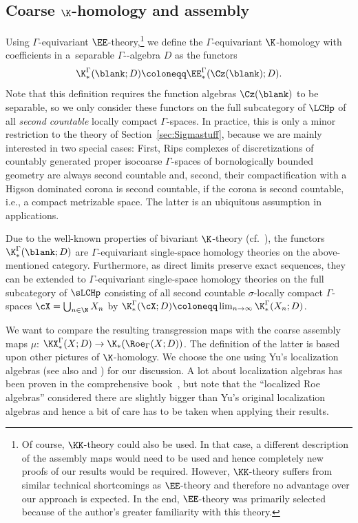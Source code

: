 \subsection[Coarse K-homology and assembly]{Coarse $\boldsymbol{\K}$-homology and assembly}\label{sec:Assembly}

Using $\Gamma$-equivariant $\EE$-theory,\footnote{Of course, $\KK$-theory could also be used. In that case, a different description of the assembly maps would need to be used and hence completely new proofs of our results would be required. However, $\KK$-theory suffers from similar technical shortcomings as $\EE$-theory and therefore no advantage over our approach is expected. In the end, $\EE$-theory was primarily selected because of the author's greater familiarity with this theory.} we define the $\Gamma$-equivariant $\K$-homology with coefficients in a~separable $\Gamma$-\textCstar-algebra $D$ as the functors
\[
\K^\Gamma_*(\blank;D)\coloneqq \EE^\Gamma_*(\Cz(\blank);D).
\]
Note that this definition requires the function algebras $\Cz(\blank)$ to be separable, so we only consider these functors on the full subcategory of $\LCHp$ of all \emph{second countable} locally compact $\Gamma$-spaces.
In practice, this is only a minor restriction to the theory of Section~\ref{sec:Sigmastuff}, because we are mainly interested in two special cases: First, Rips complexes of discretizations of countably generated proper isocoarse $\Gamma$-spaces of bornologically bounded geometry are always second countable and, second, their compactification with a Higson dominated corona is second countable, if the corona is second countable, i.e., a compact metrizable space. The latter is an ubiquitous assumption in applications.


Due to the well-known properties of bivariant $\K$-theory (cf.\ \cite[Chapter~6]{GueHigTro}), the functors $\K^\Gamma_*(\blank;D)$ are $\Gamma$-equivariant single-space homology theories on the above-mentioned category. Furthermore, as direct limits preserve exact sequences, they can be extended to $\Gamma$-equivariant single-space homology theories on the full subcategory of $\sLCHp$ consisting of all second countable $\sigma$-locally compact $\Gamma$-spaces $\cX=\bigcup_{n\in\N}X_n$ by
\(\K^\Gamma_*(\cX;D)\coloneqq\lim_{n\to\infty}\K^\Gamma_*(X_n;D)\).


We want to compare the resulting transgression maps with the coarse assembly maps $\mu$: $\KX^\Gamma_*(X;D)\to\K_*(\Roe_\Gamma(X;D))$. The definition of the latter is based upon other pictures of $\K$-homology.
We choose the one using Yu's localization algebras \cite{YuLocalization} (see also \cite{QiaoRoe} and \cite{EngelWulffZeidler}) for our discussion.
A lot about localization algebras has been proven in the comprehensive book~\cite{WillettYuHigherIndexTheory}, but note that the ``localized Roe algebras'' considered there are slightly bigger than Yu's original localization algebras and hence a bit of care has to be taken when applying their results.

